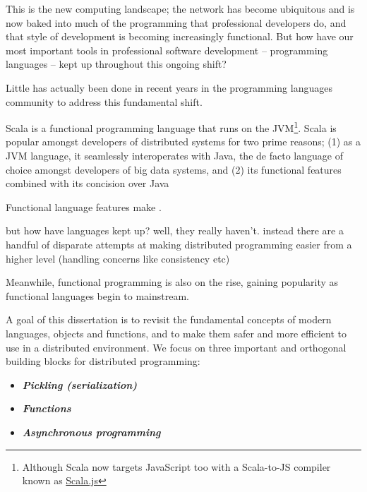 
This is the new computing landscape; the network has become ubiquitous and is
now baked into much of the programming that professional developers do, and that
style of development is becoming increasingly functional. But how have our most
important tools in professional software development -- programming languages --
kept up throughout this ongoing shift?


Little has actually been done in recent years in the programming languages
community to address this fundamental shift.

Scala is a functional programming language that runs on the
JVM\footnote{Although Scala now targets JavaScript too with a Scala-to-JS
compiler known as \href{http://www.scala-js.org/}{Scala.js}}. Scala is popular
amongst developers of distributed systems for two prime reasons; (1) as a JVM
language, it seamlessly interoperates with Java, the de facto language of choice
amongst developers of big data systems, and (2) its functional features combined
with its concision over Java

Functional language features make .


but how have languages kept up? well, they really haven't. instead there are a
handful of disparate attempts at making distributed programming easier from a
higher level (handling concerns like consistency etc)

Meanwhile, functional programming is also on the rise, gaining popularity as
functional languages begin to mainstream.

A goal of this dissertation is to revisit the fundamental concepts of modern
languages, objects and functions, and to make them safer and more efficient to
use in a distributed environment. We focus on three important and orthogonal
building blocks for distributed programming:


\begin{itemize}
  \item {\bf \em Pickling (serialization)}
  \item {\bf \em Functions}
  \item {\bf \em Asynchronous programming}
\end{itemize}

